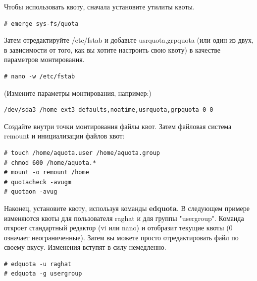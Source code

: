 \documentclass[10pt]{book}
\begin{document}
Чтобы использовать квоту, сначала установите утилиты квоты.

\begin{tcolorbox} 
\begin{lstlisting}
# emerge sys-fs/quota
\end{lstlisting}
\end{tcolorbox}

Затем отредактируйте /etc/fstab и добавьте usrquota,grpquota (или один из двух, в зависимости от того, как вы хотите настроить свою квоту) в качестве параметров монтирования.

\begin{tcolorbox} 
\begin{lstlisting}
# nano -w /etc/fstab
\end{lstlisting}
\end{tcolorbox}

(Измените параметры монтирования, например:)

\begin{tcolorbox} 
\begin{lstlisting}
/dev/sda3 /home ext3 defaults,noatime,usrquota,grpquota 0 0
\end{lstlisting}
\end{tcolorbox}

Создайте внутри точки монтирования файлы квот. Затем файловая система remount и инициализации файлов квот:

\begin{tcolorbox} 
\begin{lstlisting}
# touch /home/aquota.user /home/aquota.group
# chmod 600 /home/aquota.*
# mount -o remount /home
# quotacheck -avugm
# quotaon -avug
\end{lstlisting}
\end{tcolorbox}

Наконец, установите квоту, используя команды \textbf{edquota}. В следующем примере изменяются квоты для пользователя raghat и для группы "usergroup". Команда откроет стандартный редактор (vi или nano) и отобразит текущие квоты (0 означает неограниченные). Затем вы можете просто отредактировать файл по своему вкусу.
Изменения вступят в силу немедленно.

\begin{tcolorbox} 
\begin{lstlisting}
# edquota -u raghat
# edquota -g usergroup
\end{lstlisting}
\end{tcolorbox}

\newpage
\end{document}
